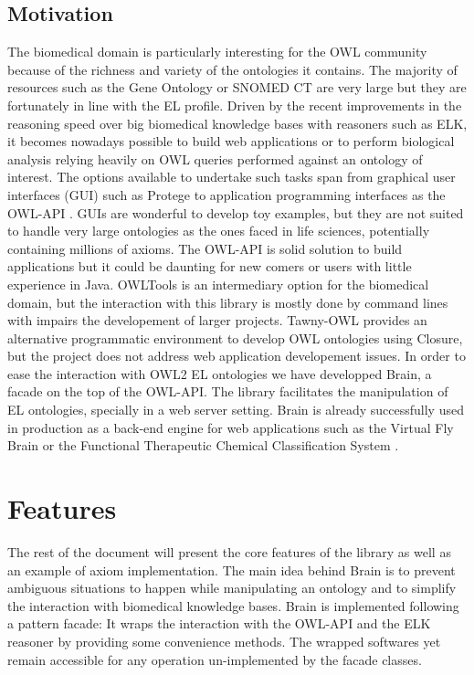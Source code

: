 \documentclass{llncs}
\begin{document}
\subsection{Motivation}
The biomedical domain is particularly interesting for the OWL community because of the richness and variety of the ontologies it contains.
The majority of resources such as the Gene Ontology \cite{Ashburner2000} or SNOMED CT \cite{snomed} are very large but they are fortunately in line with 
the EL profile.
Driven by the recent improvements in the reasoning speed over big biomedical knowledge bases with reasoners such as ELK,
it becomes nowadays possible to build web applications or to perform biological analysis relying heavily on OWL queries performed against
an ontology of interest. 
The options available to undertake such tasks span from graphical user interfaces (GUI) such as Protege \cite{protege} to application 
programming interfaces as
the OWL-API \cite{MatthewHorridge2011}. GUIs are wonderful to develop toy examples, but they are not suited to handle very large 
ontologies as the ones faced in life sciences, potentially containing millions of axioms. The OWL-API is solid solution to build
applications but it could be daunting for new comers or users with little experience in Java.
OWLTools \cite{owltools} is an intermediary option for the
biomedical domain, but the interaction with this library is mostly done by command lines with impairs the developement of larger projects.
Tawny-OWL \cite{tawny} provides an alternative programmatic environment to develop OWL ontologies using Closure, but the project does
not address web application developement issues.
In order to ease the interaction with OWL2 EL ontologies we have developped Brain, a facade on the top of the OWL-API. 
The library facilitates the manipulation of EL ontologies, specially in a web server setting. 
Brain is already successfully used in production as a back-end engine for web applications 
such as the Virtual Fly Brain \cite{vfb} or the Functional Therapeutic Chemical Classification System \cite{ftc}.

\section{Features}
The rest of the document will present the core features of the library as well as an example of axiom implementation.
The main idea behind Brain is to prevent ambiguous situations to happen while manipulating an ontology and to simplify 
the interaction with biomedical knowledge bases. Brain is implemented following a pattern facade: 
It wraps the interaction with the OWL-API and the ELK reasoner \cite{YevgenyKazakov2011} by providing some convenience methods.
The wrapped softwares yet remain accessible for any operation un-implemented by the facade classes.
\end{document}
